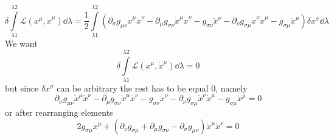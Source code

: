 \begin{equation}
    \delta\int\limits_{\lambda1}^{\lambda2}\mathcal{L}(x^\mu,\dot{x}^\mu)\dd\lambda =
    \frac{1}{2}\int\limits_{\lambda1}^{\lambda2}
    \left(\partial_\sigma g_{\mu\nu}\dot{x}^\mu\dot{x}^\nu -
    \partial_{\mu}g_{\sigma\nu}\dot{x}^\mu\dot{x}^\nu - g_{\sigma\nu}\ddot{x}^\nu -
    \partial_{\nu}g_{\sigma\mu}\dot{x}^\nu\dot{x}^\mu - g_{\sigma\mu}\ddot{x}^\mu\right)\delta x^\sigma \dd\lambda
\end{equation}
%
We want
%
\begin{equation}
    \delta\int\limits_{\lambda1}^{\lambda2}\mathcal{L}(x^\mu,\dot{x}^\mu)\dd\lambda = 0
\end{equation}
%
but since $\delta x^\sigma$ can be arbitrary the rest has to be equal $0$, namely
%
\begin{equation}
    \partial_\sigma g_{\mu\nu}\dot{x}^\mu\dot{x}^\nu -
    \partial_{\mu}g_{\sigma\nu}\dot{x}^\mu\dot{x}^\nu - g_{\sigma\nu}\ddot{x}^\nu -
    \partial_{\nu}g_{\sigma\mu}\dot{x}^\nu\dot{x}^\mu - g_{\sigma\mu}\ddot{x}^\mu = 0
\end{equation}
%
or after rearranging elements
%
\begin{equation}
    \boxed{2 g_{\sigma\mu}\ddot{x}^\mu + \left(\partial_{\nu}g_{\sigma\mu} + 
    \partial_{\mu}g_{\sigma\nu} - \partial_\sigma g_{\mu\nu}\right)\dot{x}^\mu\dot{x}^\nu = 0}
\end{equation}
